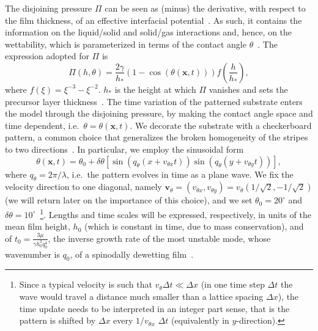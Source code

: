 \documentclass[amsmath,amssymb,showpacs,prf,superscriptaddress, longbibliography]{revtex4-1} %
\begin{document}
The disjoining pressure $\Pi$ can be seen as (minus) the derivative, with respect to the film thickness, of an effective interfacial potential~\cite{Deryaguin1940, DeryaguinChuraev1978}.
As such, it contains the information on the liquid/solid and solid/gas interactions and, hence, on the wettability, which is parameterized in terms of the contact angle $\theta$~\cite{bonnWettingSpreading2009, schwartzSimulationDropletMotion1998, youngIIIEssayCohesion1805, degennesWettingStaticsDynamics1985}. 
The expression adopted for $\Pi$ is
\begin{equation}\label{eq:disjoinpressure}
\Pi(h,\theta) = \frac{2\gamma}{h_{\ast}}(1-\cos(\theta(\mathbf{x},t)))
  f\left(\frac{h}{h_{\ast}}\right),
\end{equation}
where $f(\xi)=\xi^{-3} - \xi^{-2}$. $h_{\ast}$ is the height at which $\Pi$ vanishes and sets the precursor layer thickness~\cite{SuppMat, schwartzSimulationDropletMotion1998, mitlinDewettingSolidSurface1993, teletzkeHowLiquidsSpread1987}.
The time variation of the patterned substrate enters the model through the disjoining pressure, by making the contact angle space and time dependent, i.e.~$\theta = \theta(\mathbf{x},t)$.
We decorate the substrate with a checkerboard pattern, a common choice that generalizes the broken homogeneity of the stripes to two 
directions~\cite{jalaliFabricationCharacterizationScalable2018, nagayamaIntermediateWettingState2020, dasSurfacedirectedSpinodalDecomposition2020}.
In particular, we employ the sinusoidal form
\begin{equation}\label{eq:sinetheta}
   \!\! \theta(\mathbf{x},t) = \theta_0 + \delta\theta\left[\sin\left(q_{\theta} (x+v_{\theta x}t)\right)\sin\left(q_{\theta}(y+v_{\theta y}t)\right)\right],\! 
\end{equation}
where $q_{\theta} = 2\pi/\lambda$, i.e.~the pattern evolves in time as a plane wave.
We fix the velocity direction to one diagonal, namely $\mathbf{v}_{\theta} = (v_{\theta x},v_{\theta y}) = v_{\theta}(1/\sqrt{2},-1/\sqrt{2})$ (we will return later on the importance of this choice), and we set $\theta_0 = 20^{\circ}$ and $\delta\theta=10^{\circ}$~\footnote{Since a typical velocity is such that $v_{\theta} \Delta t \ll \Delta x$ (in one time step $\Delta t$ the wave would travel a distance much smaller than a lattice spacing $\Delta x$),
the time update needs to be interpreted in an integer part sense, that is the pattern is shifted by $\Delta x$ every $1/v_{\theta x}$ $\Delta t$ (equivalently in $y$-direction).}.
Lengths and time scales will be expressed, respectively, in units of the mean film height, $h_0$ (which is constant in time, due to mass conservation), and of $t_0 = \frac{3\mu}{\gamma h_0^3 q_0^4}$, the inverse growth rate of the most unstable mode, whose wavenumber is $q_0$, of a spinodally dewetting film~\cite{meckeThermalFluctuationsThin2005}. 
\end{document}
